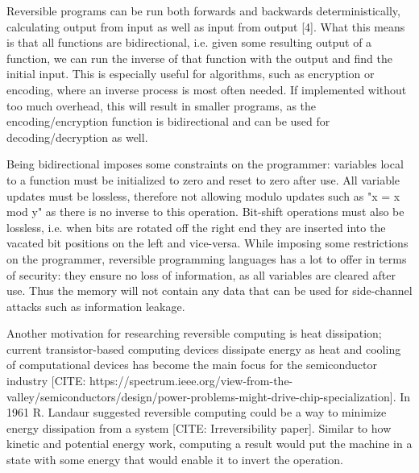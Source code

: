 
Reversible programs can be run both forwards and backwards deterministically, calculating output from input as well as input from output [4].
What this means is that all functions are bidirectional, i.e. given some resulting output of a function, we can run the inverse of that function with the output and find the initial input.
This is especially useful for algorithms, such as encryption or encoding, where an inverse process is most often needed.
If implemented without too much overhead, this will result in smaller programs, as the encoding/encryption function is bidirectional and can be used for decoding/decryption as well.

Being bidirectional imposes some constraints on the programmer: variables local to a function must be initialized to zero and reset to zero after use.
All variable updates must be lossless, therefore not allowing modulo updates such as "x = x mod y" as there is no inverse to this operation.
Bit-shift operations must also be lossless, i.e. when bits are rotated off the right end they are inserted into the vacated bit positions on the left and vice-versa. While imposing some restrictions on the programmer, reversible programming languages has a lot to offer in terms of security: they ensure no loss of information, as all variables are cleared after use. Thus the memory will not contain any data that can be used for side-channel attacks such as information leakage.

Another motivation for researching reversible computing is heat dissipation; current transistor-based computing devices dissipate energy as heat and cooling of computational devices has become the main focus for the semiconductor industry [CITE: https://spectrum.ieee.org/view-from-the-valley/semiconductors/design/power-problems-might-drive-chip-specialization]. In 1961 R. Landaur suggested reversible computing could be a way to minimize energy dissipation from a system [CITE: Irreversibility paper]. Similar to how kinetic and potential energy work, computing a result would put the machine in a state with some energy that would enable it to invert the operation.
